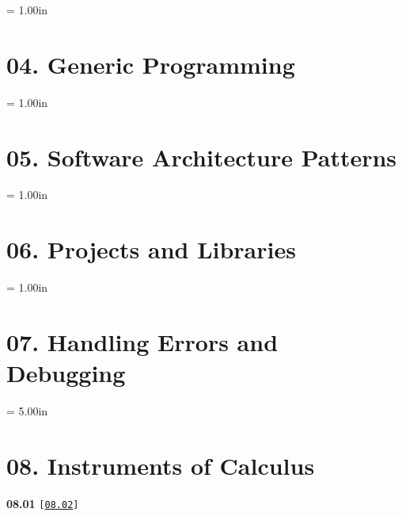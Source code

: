 \documentclass[a4paper,12pt]{article}
\begin{document}
\newpage\thispagestyle{empty}\pdfpageheight = 1.00in\enlargethispage{100in}

\section{04. Generic Programming}



\newpage\thispagestyle{empty}\pdfpageheight = 1.00in\enlargethispage{100in}

\section{05. Software Architecture Patterns}



\newpage\thispagestyle{empty}\pdfpageheight = 1.00in\enlargethispage{100in}

\section{06. Projects and Libraries}



\newpage\thispagestyle{empty}\pdfpageheight = 1.00in\enlargethispage{100in}

\section{07. Handling Errors and Debugging}



\newpage\thispagestyle{empty}\pdfpageheight = 5.00in\enlargethispage{100in}

\section{08. Instruments of Calculus}

{\large \textbf{08.01} \texttt{[\href{https://github.com/i-s-m-mipt/Education/blob/master/projects/examples/source/08.02.cpp}{\texttt{08.02}}]}}

\bigskip
\end{document}
